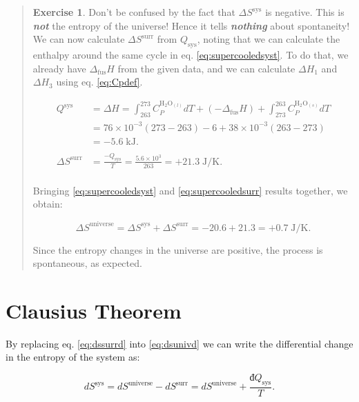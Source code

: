 \documentclass[
  9pt,
]{extbook}
\theoremstyle{definition}
\theoremstyle{definition}
\theoremstyle{definition}
\newtheorem{exercise}{Exercise}[chapter]
\theoremstyle{remark}
\begin{document}
\begin{quote}
\begin{exercise}
Don't be confused by the fact that \(\Delta S^{\text{sys}}\) is negative. This is \textbf{\emph{not}} the entropy of the universe! Hence it tells \textbf{\emph{nothing}} about spontaneity! We can now calculate \(\Delta S^{\text{surr}}\) from \(Q_{\text{sys}}\), noting that we can calculate the enthalpy around the same cycle in eq. \eqref{eq:supercooledsyst}. To do that, we already have \(\Delta_{\mathrm{fus}}H\) from the given data, and we can calculate \(\Delta H_1\) and \(\Delta H_3\) using eq. \eqref{eq:Cpdef}.

\begin{equation}
\begin{aligned}
Q^{\text{sys}} & = \Delta H = \int_{263}^{273} C_P^{\mathrm{H}_2 \mathrm{O}_{(l)}} dT + (-\Delta_{\mathrm{fus}}H) + \int_{273}^{263} C_P^{\mathrm{H}_2 \mathrm{O}_{(s)}}dT \\
& = 76 \times 10^{-3} (273-263) - 6 + 38  \times 10^{-3} (263-273) \\ &= -5.6 \; \text{kJ}. \\
\\
\Delta S^{\text{surr}} & = \frac{-Q_{\text{sys}}}{T}=\frac{5.6 \times 10^3}{263} = + 21.3 \; \text{J/K}. \\
\end{aligned}
\label{eq:supercooledsurr}
\end{equation}

Bringing \eqref{eq:supercooledsyst} and \eqref{eq:supercooledsurr} results together, we obtain:

\begin{equation}
\Delta S^{\text{universe}}=\Delta S^{\text{sys}} + \Delta S^{\text{surr}} =  -20.6+21.3=+0.7 \; \text{J/K}.
\label{eq:supercooledfinal}
\end{equation}

Since the entropy changes in the universe are positive, the process is spontaneous, as expected.
\end{exercise}
\end{quote}

\hypertarget{spontS}{%
\section{Clausius Theorem}\label{spontS}}

By replacing eq. \eqref{eq:dssurrd} into \eqref{eq:dsunivd} we can write the differential change in the entropy of the system as:

\begin{equation}
d S^{\mathrm{sys}} = d S^{\mathrm{universe}} - d S^{\mathrm{surr}} = d S^{\mathrm{universe}} + \frac{đQ_{\text{sys}}}{T}.
\label{eq:dssysd}
\end{equation}
\end{document}
